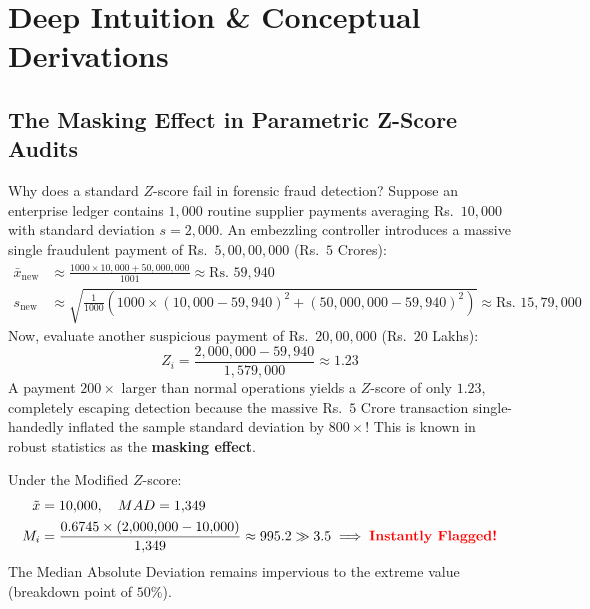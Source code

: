 \section{Deep Intuition \& Conceptual Derivations}

\subsection{The Masking Effect in Parametric Z-Score Audits}
Why does a standard $Z$-score fail in forensic fraud detection?
Suppose an enterprise ledger contains $1{,}000$ routine supplier payments averaging Rs.~$10{,}000$ with standard deviation $s = 2{,}000$. An embezzling controller introduces a massive single fraudulent payment of Rs.~$5{,}00{,}00{,}000$ (Rs.~$5$ Crores):
\begin{align*}
\bar{x}_{\text{new}} &\approx \frac{1000 \times 10{,}000 + 50{,}000{,}000}{1001} \approx \text{Rs.~} 59{,}940 \\
s_{\text{new}} &\approx \sqrt{\frac{1}{1000} \left(1000 \times (10{,}000 - 59{,}940)^2 + (50{,}000{,}000 - 59{,}940)^2\right)} \approx \text{Rs.~} 15{,}79{,}000
\end{align*}
Now, evaluate another suspicious payment of Rs.~$20{,}00{,}000$ (Rs.~$20$ Lakhs):
\begin{equation}
Z_i = \frac{2{,}000{,}000 - 59{,}940}{1{,}579{,}000} \approx 1.23
\end{equation}
A payment $200\times$ larger than normal operations yields a $Z$-score of only $1.23$, completely escaping detection because the massive Rs.~$5$ Crore transaction single-handedly inflated the sample standard deviation by $800\times$! This is known in robust statistics as the \textbf{masking effect}. 

Under the Modified $Z$-score:
\begin{align*}
\tilde{x} &= 10{,}000, \quad MAD = 1{,}349 \\
M_i &= \frac{0.6745 \times (2{,}000{,}000 - 10{,}000)}{1{,}349} \approx 995.2 \gg 3.5 \implies \text{\textcolor{red}{\textbf{Instantly Flagged!}}}
\end{align*}
The Median Absolute Deviation remains impervious to the extreme value (breakdown point of $50\%$).


